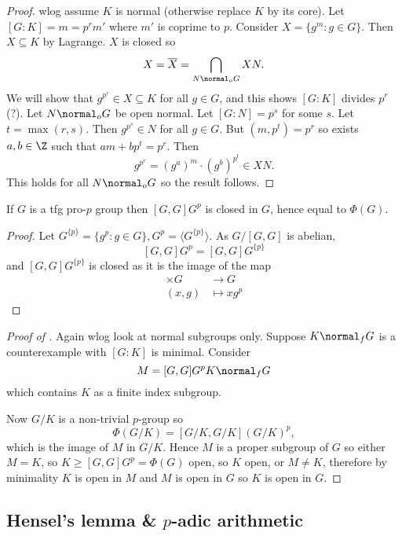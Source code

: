 \documentclass[a4paper]{article}
\begin{document}
\begin{proof}
  wlog assume \(K\) is normal (otherwise replace \(K\) by its core). Let \([G: K] = m = p^r m'\) where \(m'\) is coprime to \(p\). Consider \(X = \{g^m:g \in G\}\). Then \(X \subseteq K\) by Lagrange. \(X\) is closed so
  \[
    X = \overline X = \bigcap_{N \normal_o G} XN.
  \]
  We will show that \(g^{p^r} \in X \subseteq K\) for all \(g \in G\), and this shows \([G: K]\) divides \(p^r\) (?). Let \(N \normal_o G\) be open normal. Let \([G: N] = p^s\) for some \(s\). Let \(t = \max(r, s)\). Then \(g^{p^s} \in N\) for all \(g \in G\). But \((m, p^t) = p^r\) so exists \(a, b \in \Z\)  such that \(am + bp^t = p^r\). Then
  \[
    g^{p^r} = (g^a)^m \cdot (g^b)^{p^t} \in XN.
  \]
  This holds for all \(N \normal_o G\) so the result follows.
\end{proof}

\begin{proposition}
  If \(G\) is a tfg pro-\(p\) group then \([G, G]G^p\) is closed in \(G\), hence equal to \(\Phi(G)\).
\end{proposition}

\begin{proof}
  Let \(G^{\{p\}} = \{g^p: g \in G\}, G^p = \langle G^{\{p\}} \rangle\). As \(G/[G, G]\) is abelian,
  \[
    [G, G]G^p = [G, G]G^{\{p\}}
  \]
  and \([G, G]G^{\{p\}}\) is closed as it is the image of the map
  \begin{align*}
    [G, G] \times G &\to G \\
    (x, g) &\mapsto xg^p
  \end{align*}
\end{proof}

\begin{proof}[Proof of ]
  Again wlog look at normal subgroups only. Suppose \(K \normal_f G\) is a counterexample with \([G: K]\) is minimal. Consider
  \[
    M = [G, G]G^p K \normal_f G
  \]
  which contains \(K\) as a finite index subgroup.

  Now \(G/K\) is a non-trivial \(p\)-group so
  \[
    \Phi(G/K) = [G/K, G/K](G/K)^p,
  \]
  which is the image of \(M\) in \(G/K\). Hence \(M\) is a proper subgroup of \(G\) so either \(M = K\), so \(K \geq [G, G] G^p = \Phi(G)\) open, so \(K\) open, or \(M \ne K\), therefore by minimality \(K\) is open in \(M\) and \(M\) is open in \(G\) so \(K\) is open in \(G\).
\end{proof}

\subsection{Hensel's lemma \& \(p\)-adic arithmetic}
\end{document}
